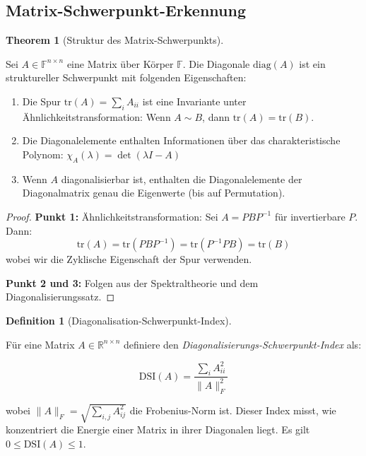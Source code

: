 \documentclass[a4paper,12pt]{article}
\theoremstyle{definition}
\newtheorem{definition}{Definition}
\newtheorem{theorem}{Theorem}
\begin{document}
\subsection{Matrix-Schwerpunkt-Erkennung}

\begin{theorem}[Struktur des Matrix-Schwerpunkts]
\label{thm:matrix_schwerpunkt_struktur}

Sei $A \in \mathbb{F}^{n \times n}$ eine Matrix über Körper $\mathbb{F}$. Die Diagonale $\text{diag}(A)$ ist ein struktureller Schwerpunkt mit folgenden Eigenschaften:

\begin{enumerate}
\item Die Spur $\text{tr}(A) = \sum_i A_{ii}$ ist eine Invariante unter Ähnlichkeitstransformation: Wenn $A \sim B$, dann $\text{tr}(A) = \text{tr}(B)$.

\item Die Diagonalelemente enthalten Informationen über das charakteristische Polynom: $\chi_A(\lambda) = \det(\lambda I - A)$

\item Wenn $A$ diagonalisierbar ist, enthalten die Diagonalelemente der Diagonalmatrix genau die Eigenwerte (bis auf Permutation).
\end{enumerate}

\begin{proof}
\textbf{Punkt 1:} Ähnlichkeitstransformation: Sei $A = PBP^{-1}$ für invertierbare $P$. Dann:
\[
\text{tr}(A) = \text{tr}(PBP^{-1}) = \text{tr}(P^{-1}PB) = \text{tr}(B)
\]
wobei wir die Zyklische Eigenschaft der Spur verwenden.

\textbf{Punkt 2 und 3:} Folgen aus der Spektraltheorie und dem Diagonalisierungssatz.
\end{proof}
\end{theorem}

\begin{definition}[Diagonalisation-Schwerpunkt-Index]
\label{def:diag_index}

Für eine Matrix $A \in \mathbb{R}^{n \times n}$ definiere den \emph{Diagonalisierungs-Schwerpunkt-Index} als:

\[
\text{DSI}(A) = \frac{\sum_i A_{ii}^2}{\|A\|_F^2}
\]

wobei $\|A\|_F = \sqrt{\sum_{i,j} A_{ij}^2}$ die Frobenius-Norm ist. Dieser Index misst, wie konzentriert die Energie einer Matrix in ihrer Diagonalen liegt. Es gilt $0 \leq \text{DSI}(A) \leq 1$.
\end{definition}
\end{document}
